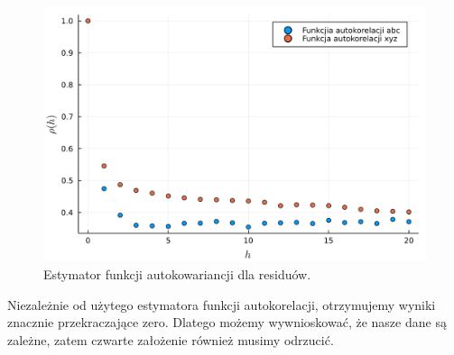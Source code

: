 \documentclass[12pt]{article}
\theoremstyle{exer}
\begin{document}
	\begin{figure}[H]
		\centering
		\includegraphics[width=4\columnwidth/5]{images/Budnik/corr.png}
		\caption{Estymator funkcji autokowariancji dla residuów.}
	\end{figure}
	Niezależnie od użytego estymatora funkcji autokorelacji, otrzymujemy wyniki znacznie przekraczające zero. Dlatego możemy wywnioskować, że nasze dane są zależne, zatem czwarte założenie również musimy odrzucić.
	
	
	
	
\end{document}
